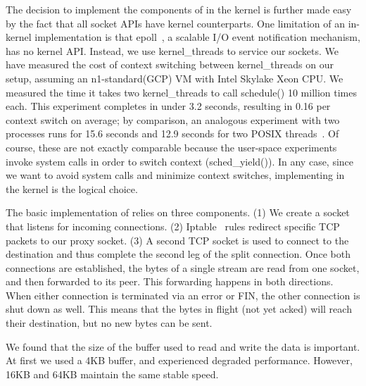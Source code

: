 The decision to implement the components of \oursys in the kernel is further made easy by the fact that all socket APIs have kernel counterparts. One limitation of an in-kernel implementation is that epoll~\cite{epoll}, a scalable I/O event notification mechanism, has no kernel API. Instead, we use kernel\_threads to service our sockets. 
We have measured the cost of context switching between kernel\_threads on our setup, assuming an n1-standard(GCP) VM with Intel Skylake Xeon CPU. We measured the time it takes two kernel\_threads to call schedule() 10 million times each. This experiment completes in under 3.2 seconds, resulting in 0.16 \usec per context switch on average; by comparison, an analogous experiment with two processes runs for 15.6 seconds and 12.9 seconds for two POSIX threads~\cite{pthreads}. %
Of course, these are not exactly comparable because the user-space experiments invoke system calls in order to switch context (sched\_yield()). In any case, since we want to avoid system calls and minimize context switches, implementing \oursys in the kernel is the logical choice.

 The basic implementation of \oursys relies on three components. (1) We create a socket that listens for incoming connections. (2) Iptable~\cite{iptables} rules redirect specific TCP packets to our proxy socket. (3) A second TCP socket is used to connect to the destination and thus complete the second leg of the split connection. Once both connections are established, the bytes of a single stream are read from one socket, and then forwarded to its peer. This forwarding happens in both directions. When either connection is terminated via an error or FIN, the other connection is shut down as well. This means that the bytes in flight (\ie not yet acked) will reach their destination, but no new bytes can be sent.

 We found that the size of the buffer used to read and write the data is important. At first we used  a 4KB buffer, and experienced degraded performance. However, 16KB and 64KB maintain the same stable speed.

